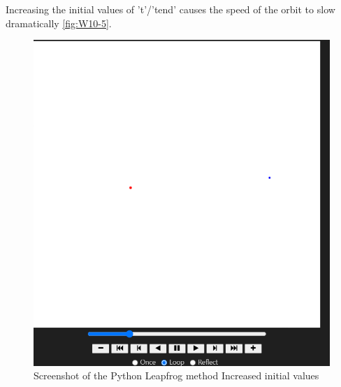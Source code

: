 Increasing the initial values of 't'/'tend' causes the speed of the orbit to slow dramatically \autoref{fig:W10-5}.
\begin{figure}[H] 
    \centering
    \includegraphics[width=0.49\columnwidth]{Figures/Week 10/5.png}
    \caption{Screenshot of the Python Leapfrog method Increased initial values}
    \label{fig:W10-5}
\end{figure}
\newpage



